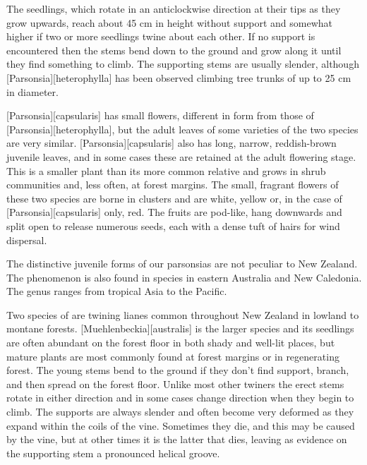 The seedlings, which rotate in an anticlockwise direction at their tips as they grow upwards, reach about 45 cm in height without support and somewhat higher if two or more seedlings twine about each other.
If no support is encountered then the stems bend down to the ground and grow along it until they find something to climb.
The supporting stems are usually slender, although [Parsonsia][heterophylla] has been observed climbing tree trunks of up to 25 cm in diameter.

[Parsonsia][capsularis] has small flowers, different in form from those of [Parsonsia][heterophylla], but the adult leaves of some varieties of the two species are very similar. [Parsonsia][capsularis] also has long, narrow, reddish-brown juvenile leaves, and in some cases these are retained at the adult flowering stage.
This is a smaller plant than its more common relative and grows in shrub communities and, less often, at forest margins.
The small, fragrant flowers of these two species are borne in clusters and are white, yellow or, in the case of [Parsonsia][capsularis] only, red.
The fruits are pod-like, hang downwards and split open to release numerous seeds, each with a dense tuft of hairs for wind dispersal.

The distinctive juvenile forms of our parsonsias are not peculiar to New Zealand.
The phenomenon is also found in species in eastern Australia and New Caledonia.
The genus ranges from tropical Asia to the Pacific.

Two species of  are twining lianes common throughout New Zealand in lowland to montane forests. [Muehlenbeckia][australis] is the larger species and its seedlings are often abundant on the forest floor in both shady and well-lit places, but mature plants are most commonly found at forest margins or in regenerating forest.
The young stems bend to the ground if they don't find support, branch, and then spread on the forest floor.
Unlike most other twiners the erect stems rotate in either direction and in some cases change direction when they begin to climb.
The supports are always slender and often become very deformed as they expand within the coils of the vine.
Sometimes they die, and this may be caused by the vine, but at other times it is the latter that dies, leaving as evidence on the supporting stem a pronounced helical groove.

